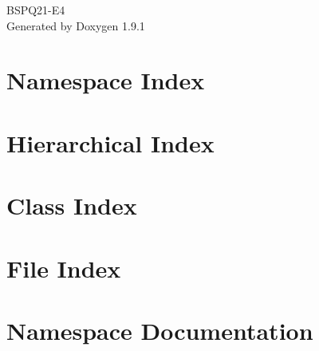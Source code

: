 \let\mypdfximage\pdfximage\def\pdfximage{\immediate\mypdfximage}\documentclass[twoside]{book}
\newcommand{\+}{\discretionary{\mbox{\scriptsize$\hookleftarrow$}}{}{}}
\newcommand{\clearemptydoublepage}{%
  \newpage{\pagestyle{empty}\cleardoublepage}%
}
\begin{document}
\raggedbottom

\hypersetup{pageanchor=false,
             bookmarksnumbered=true,
             pdfencoding=unicode
            }
\begin{titlepage}
\vspace*{7cm}
\begin{center}%
{\Large BSPQ21-\/\+E4 }\\
\vspace*{1cm}
{\large Generated by Doxygen 1.9.1}\\
\end{center}
\end{titlepage}
\clearemptydoublepage
{}
\tableofcontents
\clearemptydoublepage
{}
\hypersetup{pageanchor=true}

\chapter{Namespace Index}

\chapter{Hierarchical Index}

\chapter{Class Index}

\chapter{File Index}

\chapter{Namespace Documentation}














\end{document}
